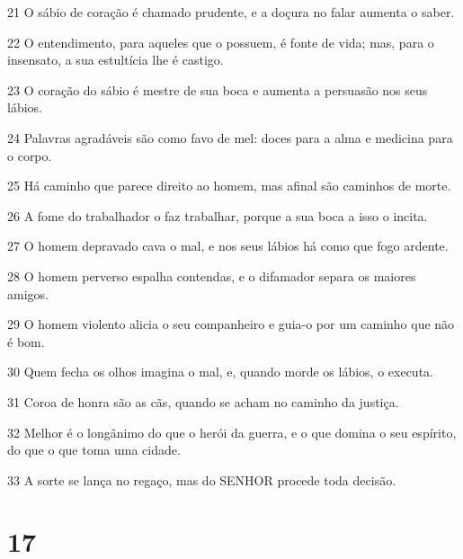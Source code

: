 \par 21 O sábio de coração é chamado prudente, e a doçura no falar aumenta o saber.
\par 22 O entendimento, para aqueles que o possuem, é fonte de vida; mas, para o insensato, a sua estultícia lhe é castigo.
\par 23 O coração do sábio é mestre de sua boca e aumenta a persuasão nos seus lábios.
\par 24 Palavras agradáveis são como favo de mel: doces para a alma e medicina para o corpo.
\par 25 Há caminho que parece direito ao homem, mas afinal são caminhos de morte.
\par 26 A fome do trabalhador o faz trabalhar, porque a sua boca a isso o incita.
\par 27 O homem depravado cava o mal, e nos seus lábios há como que fogo ardente.
\par 28 O homem perverso espalha contendas, e o difamador separa os maiores amigos.
\par 29 O homem violento alicia o seu companheiro e guia-o por um caminho que não é bom.
\par 30 Quem fecha os olhos imagina o mal, e, quando morde os lábios, o executa.
\par 31 Coroa de honra são as cãs, quando se acham no caminho da justiça.
\par 32 Melhor é o longânimo do que o herói da guerra, e o que domina o seu espírito, do que o que toma uma cidade.
\par 33 A sorte se lança no regaço, mas do SENHOR procede toda decisão.

\chapter{17}


